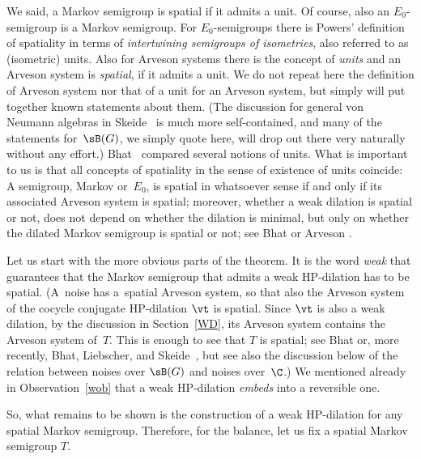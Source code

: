 We said, a Markov semigroup is spatial if it admits a unit. Of course, also an $E_0$-semigroup is a Markov semigroup. For $E_0$-semigroups there is Powers' definition \cite{Pow87} of spatiality in terms of {\it intertwining semigroups of isometries}, also referred to as (isometric) units. Also for Arveson systems there is the concept of {\it units} and an Arveson system is \emph{spatial}, if it admits a unit. We do not repeat here the definition of Arveson system nor that of a unit for an Arveson system, but simply will put together known statements about them. (The discussion for general von Neumann algebras in Skeide~\cite{Ske16} is much more self-contained, and many of the statements for~$\sB(G)$, we simply quote here, will drop out there very naturally without any effort.) Bhat~\cite[Section~6]{Bha01} compared several notions of units. What is important to us is that all concepts of spatiality in the sense of existence of units coincide: A semigroup, Markov or~$E_0$, is spatial in whatsoever sense if and only if its associated Arveson system is spatial; moreover, whether a weak dilation is spatial or not, does not depend on whether the dilation is minimal, but only on whether the dilated Markov semigroup is spatial or not; see Bhat \cite[Section~6]{Bha01} or Arveson \cite[Sections~8.9 and~8.10]{Arv03}.

Let us start with the more obvious parts of the theorem. It is the word {\it weak} that guarantees that the Markov semigroup that admits a weak HP-dilation has to be spatial. (A~noise has a~spatial Arveson system, so that also the Arveson system of the cocycle conjugate HP-dilation $\vt$ is spatial. Since $\vt$ is also a weak dilation, by the discussion in Section~\ref{WD}, its Arveson system contains the Arveson system of~$T$. This is enough to see that $T$ is spatial; see Bhat \cite[Section~6]{Bha01} or, more recently, Bhat, Liebscher, and Skeide~\cite{BLS10}, but see also the discussion below of the relation between noises over $\sB(G)$ and noises over~$\C$.) We mentioned already in Observation~\ref{wob} that a weak HP-dilation {\it embeds} into a reversible one.

So, what remains to be shown is the construction of a weak HP-dilation for any spatial Markov semigroup. Therefore, for the balance, let us fix a spatial Markov semigroup $T$.

